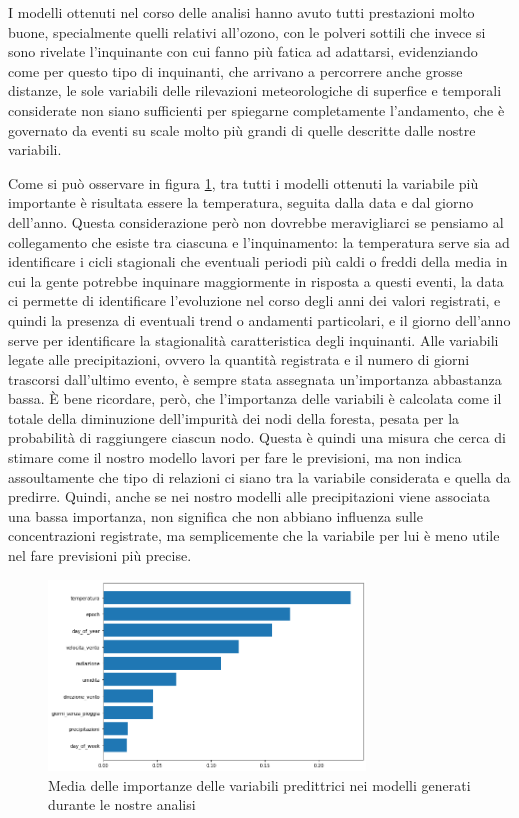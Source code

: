 \documentclass[a4paper,12pt]{report}
\begin{document}
I modelli ottenuti nel corso delle analisi hanno avuto tutti prestazioni molto buone, specialmente quelli relativi all'ozono, con le polveri sottili che invece si sono rivelate l'inquinante con cui fanno più fatica ad adattarsi, evidenziando come per questo tipo di inquinanti, che arrivano a percorrere anche grosse distanze, le sole variabili delle rilevazioni meteorologiche di superfice e temporali considerate non siano sufficienti per spiegarne completamente l'andamento, che è governato da eventi su scale molto più grandi di quelle descritte dalle nostre variabili. 

Come si può osservare in figura \ref{fig:importanza_tot}, tra tutti i modelli ottenuti la variabile più importante è risultata essere la temperatura, seguita dalla data e dal giorno dell'anno. Questa considerazione però non dovrebbe meravigliarci se pensiamo al collegamento che esiste tra ciascuna e l'inquinamento: la temperatura serve sia ad identificare i cicli stagionali che eventuali periodi più caldi o freddi della media in cui la gente potrebbe inquinare maggiormente in risposta a questi eventi, la data ci permette di identificare l'evoluzione nel corso degli anni dei valori registrati, e quindi la presenza di eventuali trend o andamenti particolari, e il giorno dell'anno serve per identificare la stagionalità caratteristica degli inquinanti.  
Alle variabili legate alle precipitazioni, ovvero la quantità registrata e il numero di giorni trascorsi dall'ultimo evento, è sempre stata assegnata un'importanza abbastanza bassa. È bene ricordare, però, che l'importanza delle variabili è calcolata come il totale della diminuzione dell'impurità dei nodi della foresta, pesata per la probabilità di raggiungere ciascun nodo. Questa è quindi una misura che cerca di stimare come il nostro modello lavori per fare le previsioni, ma non indica assoultamente che tipo di relazioni ci siano tra la variabile considerata e quella da predirre. Quindi, anche se nei nostro modelli alle precipitazioni viene associata una bassa importanza, non significa che non abbiano influenza sulle concentrazioni registrate, ma semplicemente che la variabile per lui è meno utile nel fare previsioni più precise. 

\begin{figure}[h]
\centering
\includegraphics[width=0.75\textwidth]{intro_importanza_totale}
\caption{Media delle importanze delle variabili predittrici nei modelli generati durante le nostre analisi}
\label{fig:importanza_tot}
\end{figure}
\end{document}
